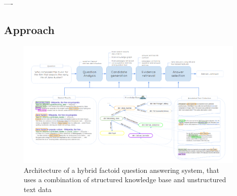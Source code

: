 ----

\subsection{Approach}
\label{subsec:text+kb_approach}

\begin{figure}
\centering
\includegraphics[width=\textwidth]{img/text_and_kb}
\caption{Architecture of a hybrid factoid question answering system, that uses a combination of structured knowledge base and unstructured text data}
\label{fig:text_kb}
\end{figure}

